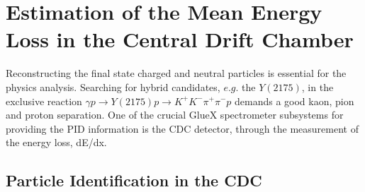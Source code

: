 \chapter{Estimation of the Mean Energy Loss in the Central Drift Chamber}
\label{p.3}

Reconstructing the final state charged and neutral particles is essential for the physics analysis. Searching for hybrid candidates, $e.g.$ the $Y(2175)$, in the exclusive reaction $\gamma p \rightarrow Y(2175) p \rightarrow K^{+}K^{-}\pi^{+}\pi^{-}p$ demands a good kaon, pion and proton separation. One of the crucial GlueX spectrometer subsystems for providing the PID information is the CDC detector, through the measurement of the energy loss, dE/dx.

\section{Particle Identification in the CDC}
\label{p.3.1}


